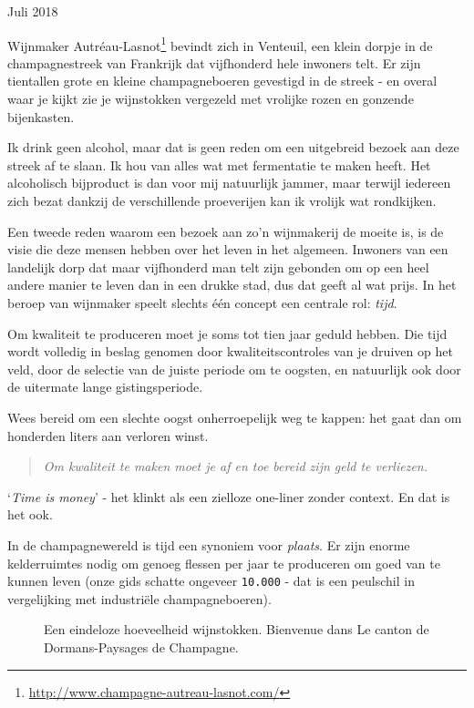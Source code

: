 \documentclass[
  11pt,
  dutch,
]{memoir}
\newcommand{\adjustimg}{%
  \checkoddpage%
  \ifoddpage\hspace*{\dimexpr\evensidemargin-\oddsidemargin}\else\hspace*{-\dimexpr\evensidemargin-\oddsidemargin}\fi%
}
\newcommand{\centerimg}[2][width=\textwidth]{%
  \makebox[\textwidth]{\adjustimg\texttt{[image: \#2]}}%
}
\begin{document}
\begin{flushright}
Juli 2018
\end{flushright}

Wijnmaker Autréau-Lasnot\footnote{\url{http://www.champagne-autreau-lasnot.com/}}
bevindt zich in Venteuil, een klein dorpje in de champagnestreek van
Frankrijk dat vijfhonderd hele inwoners telt. Er zijn tientallen grote
en kleine champagneboeren gevestigd in de streek - en overal waar je
kijkt zie je wijnstokken vergezeld met vrolijke rozen en gonzende
bijenkasten.

Ik drink geen alcohol, maar dat is geen reden om een uitgebreid bezoek
aan deze streek af te slaan. Ik hou van alles wat met fermentatie te
maken heeft. Het alcoholisch bijproduct is dan voor mij natuurlijk
jammer, maar terwijl iedereen zich bezat dankzij de verschillende
proeverijen kan ik vrolijk wat rondkijken.

Een tweede reden waarom een bezoek aan zo'n wijnmakerij de moeite is, is
de visie die deze mensen hebben over het leven in het algemeen. Inwoners
van een landelijk dorp dat maar vijfhonderd man telt zijn gebonden om op
een heel andere manier te leven dan in een drukke stad, dus dat geeft al
wat prijs. In het beroep van wijnmaker speelt slechts één concept een
centrale rol: \emph{tijd}.

Om kwaliteit te produceren moet je soms tot tien jaar geduld hebben. Die
tijd wordt volledig in beslag genomen door kwaliteitscontroles van je
druiven op het veld, door de selectie van de juiste periode om te
oogsten, en natuurlijk ook door de uitermate lange gistingsperiode.

Wees bereid om een slechte oogst onherroepelijk weg te kappen: het gaat
dan om honderden liters aan verloren winst.

\begin{quote}
\emph{Om kwaliteit te maken moet je af en toe bereid zijn geld te
verliezen.}
\end{quote}

`\emph{Time is money}' - het klinkt als een zielloze one-liner zonder
context. En dat is het ook.

In de champagnewereld is tijd een synoniem voor \emph{plaats}. Er zijn
enorme kelderruimtes nodig om genoeg flessen per jaar te produceren om
goed van te kunnen leven (onze gids schatte ongeveer \texttt{10.000} -
dat is een peulschil in vergelijking met industriële champagneboeren).

\begin{figure}
    \mbox{} \par
    \noindent\centerimg[width=\paperwidth]{img/bw/overtijdsbesef.jpg}
    \caption[Wijnstokken in Venteuil.]{Een eindeloze hoeveelheid wijnstokken. Bienvenue dans Le canton de Dormans-Paysages de Champagne.}
\end{figure}
\end{document}
